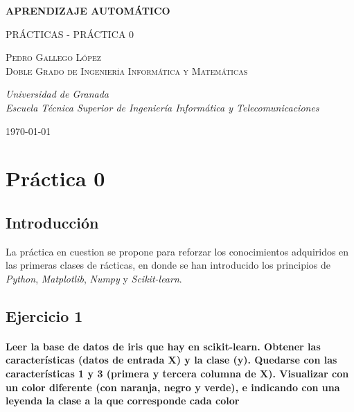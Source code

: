 \documentclass[11pt,a4paper]{report}
\begin{document}
\begin{titlepage}
  \centering

  \vspace{10cm}

                  {\scshape\Huge \textbf{APRENDIZAJE AUTOMÁTICO} \par} \vspace{1cm}
                  \vspace{5.0cm}
                         {\large\huge PRÁCTICAS - PRÁCTICA 0\\}
                         \vspace{1.7cm}
                                {\large{\huge{\scshape Pedro Gallego López}}\vspace{1.30cm}\\ \LARGE \scshape Doble Grado de Ingeniería Informática y Matemáticas \par} \vspace{8.0cm}
                                {\large\itshape Universidad de Granada \\ Escuela Técnica Superior de Ingeniería Informática y Telecomunicaciones \par} \vspace{1.00cm}
                                

                                \vfill
                                    {\large \today\par}

\end{titlepage}

\newpage

\chapter{Práctica 0}
\section*{Introducción}
La práctica en cuestion se propone para reforzar los conocimientos adquiridos en las primeras clases de rácticas, en donde se han introducido los principios de \emph{Python}, \emph{Matplotlib}, \emph{Numpy} y \emph{Scikit-learn}.

\section*{Ejercicio 1}
\subsubsection{Leer la base de datos de iris que hay en scikit-learn. Obtener las características (datos de entrada X) y la clase (y). Quedarse con las características 1 y 3 (primera y tercera columna de X). Visualizar con un color diferente (con naranja, negro y verde), e indicando con una leyenda la clase a la que corresponde cada color}
\end{document}

